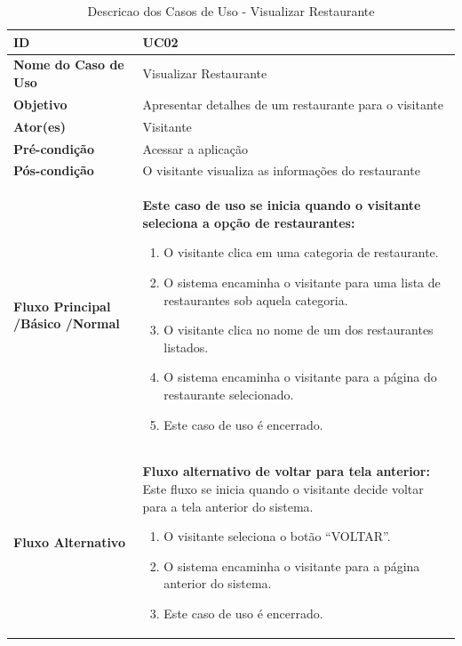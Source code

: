 \begin{table}[t]
\begin{tabular}{| p{6cm} | p{10cm} |}
	\hline
	\textbf{ID} & UC02\tabularnewline
	\hline
	\hline
	\textbf{Nome do Caso de Uso} & Visualizar Restaurante\tabularnewline
	\hline
	\textbf{Objetivo} & Apresentar detalhes de um restaurante para o visitante\tabularnewline
	\hline
	\textbf{Ator(es)} & Visitante\tabularnewline
	\hline
	\textbf{Pré-condição} & Acessar a aplicação\tabularnewline
	\hline
	\textbf{Pós-condição} & O visitante visualiza as informações do restaurante\tabularnewline
	\hline
	\textbf{Fluxo Principal /Básico /Normal} & \textbf{Este caso de uso se inicia quando o visitante seleciona a opção de restaurantes:}
	\vspace{0.2cm}
	\begin{enumerate}
		\item O visitante clica em uma categoria de restaurante.
		\item O sistema encaminha o visitante para uma lista de restaurantes sob aquela categoria.
		\item O visitante clica no nome de um dos restaurantes listados.
		\item O sistema encaminha o visitante para a página do restaurante selecionado.
		\item Este caso de uso é encerrado.
	\end{enumerate} \tabularnewline
	\hline
	\textbf{Fluxo Alternativo} & \textbf{Fluxo alternativo de voltar para tela anterior:}
	\vspace{0.2cm}
	Este fluxo se inicia quando o visitante decide voltar para a tela anterior do sistema.
	\begin{enumerate}
		\item O visitante seleciona o botão “VOLTAR”.
		\item O sistema encaminha o visitante para a página anterior do sistema.
		\item Este caso de uso é encerrado.
	\end{enumerate} \tabularnewline
	\hline
\end{tabular}
\caption{Descricao dos Casos de Uso - Visualizar Restaurante}
\label{DCU_Vizualizar_Restaurante}
\end{table}


